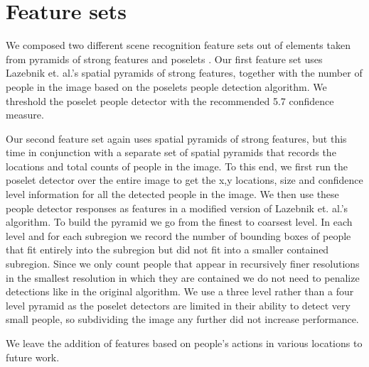 \documentclass[11pt]{article}
\begin{document}
\section{Feature sets}

We composed two different scene recognition feature sets out of elements taken from pyramids of strong features and poselets \cite{poselets} \cite{beyond_bags}. Our first feature set uses Lazebnik et. al.'s spatial pyramids of strong features, together with the number of people in the image based on the poselets people detection algorithm. We threshold the poselet people detector with the recommended 5.7 confidence measure.

Our second feature set again uses spatial pyramids of strong features, but this time in conjunction with a separate set of spatial pyramids that records the locations and total counts of people in the image. To this end, we first run the poselet detector over the entire image to get the x,y locations, size and confidence level information for all the detected people in the image. We then use these people detector responses as features in a modified version of  Lazebnik et. al.'s algorithm. To build the pyramid we go from the finest to coarsest level. In each level and for each subregion we record the number of bounding boxes of people that fit entirely into the subregion but did not fit into a smaller contained subregion. Since we only count people that appear in recursively finer resolutions in the smallest resolution in which they are contained we do not need to penalize detections like in the original algorithm. We use a three level rather than a four level pyramid as the poselet detectors are limited in their ability to detect very small people, so subdividing the image any further did not increase performance.

We leave the addition of features based on people's actions in various locations to future work.

\end{document}
